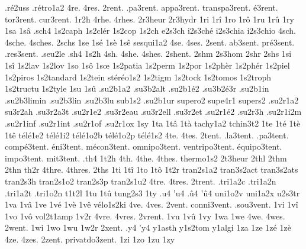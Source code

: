 {.ré2uss
.rétro1a2
4re.
4res.
2rent.
.pa3rent.
appa3rent.
transpa3rent.
é3rent.
tor3rent.
cur3rent.
1r2h
4rhe.
4rhes.
2r3heur
2r3hydr
1ri
1rî
1ro
1rô
1ru
1rû
1ry
1sa
1sâ
.sch4
1s2caph
1s2clér
1s2cop
1s2ch
e2s3ch
i2s3ché
i2s3chia
i2s3chio
4sch.
4sche.
4sches.
2schs
1se
1sé
1sè
1sê
sesqui1a2
4se.
4ses.
2sent.
ab3sent.
pré3sent.
.res3sent.
.seu2le
.sh4
1s2h
4sh.
4she.
4shes.
2shent.
2shm
2s3hom
2shr
2shs
1si
1sî
1s2lav
1s2lov
1so
1sô
1sœ
1s2patia
1s2perm
1s2por
1s2phèr
1s2phér
1s2piel
1s2piros
1s2tandard
1s2tein
stéréo1s2
1s2tigm
1s2tock
1s2tomos
1s2troph
1s2tructu
1s2tyle
1su
1sû
.su2b1a2
.su3b2alt
.su2b1é2
.su3b2é3r
.su2b1in
.su2b3limin
.su2b3lin
.su2b3lu
sub1s2
.su2b1ur
supero2
supe4r1
supers2
.su2r1a2
su3r2ah
.su3r2a3t
.su2r1e2
.su3r2eau
.su3r2ell
.su3r2et
.su2r1é2
.su2r3h
.su2r1i2m
.su2r1inf
.su2r1int
.su2r1of
.su2r1ox
1sy
1ta
1tâ
1tà
tachy1a2
tchin3t2
1te
1té
1tè
1tê
télé1e2
télé1i2
télé1o2b
télé1o2p
télé1s2
4te.
4tes.
2tent.
.la3tent.
.pa3tent.
compé3tent.
éni3tent.
mécon3tent.
omnipo3tent.
ventripo3tent.
équipo3tent.
impo3tent.
mit3tent.
.th4
1t2h
4th.
4the.
4thes.
thermo1s2
2t3heur
2thl
2thm
2thn
th2r
4thre.
4thres.
2ths
1ti
1tî
1to
1tô
1t2r
tran2s1a2
tran3s2act
tran3s2ats
tran2s3h
tran2s1o2
tran2s3p
tran2s1u2
4tre.
4tres.
2trent.
.tri1a2c
.tri1a2n
.tri1a2t
.tri1o2n
t1t2l
1tu
1tû
tung2s3
1ty
.u4
'u4
.û4
'û4
uni1o2v
uni1a2x
u2s3tr
1va
1vâ
1ve
1vé
1vè
1vê
vélo1s2ki
4ve.
4ves.
2vent.
conni3vent.
.sou3vent.
1vi
1vî
1vo
1vô
vol2t1amp
1v2r
4vre.
4vres.
2vrent.
1vu
1vû
1vy
1wa
1we
4we.
4wes.
2went.
1wi
1wo
1wu
1w2r
2xent.
.y4
'y4
y1asth
y1s2tom
y1algi
1za
1ze
1zé
1zè
4ze.
4zes.
2zent.
privatdo3zent.
1zi
1zo
1zu
1zy
}
